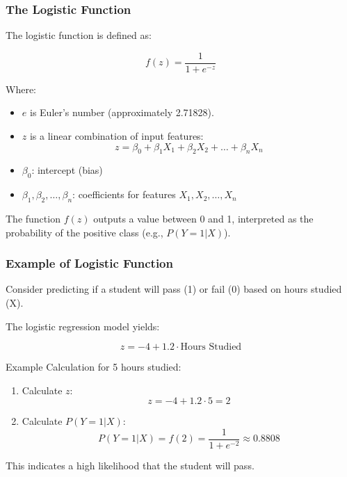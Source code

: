 \documentclass[aspectratio=169]{beamer}
\begin{document}
\begin{frame}[fragile]
    \frametitle{The Logistic Function}
    The logistic function is defined as:
    
    \begin{equation}
        f(z) = \frac{1}{1 + e^{-z}}
    \end{equation}
    
    Where:
    \begin{itemize}
        \item \( e \) is Euler's number (approximately 2.71828).
        \item \( z \) is a linear combination of input features:
        \begin{equation}
            z = \beta_0 + \beta_1 X_1 + \beta_2 X_2 + \dots + \beta_n X_n
        \end{equation}
        \item \( \beta_0 \): intercept (bias)
        \item \( \beta_1, \beta_2, \ldots, \beta_n \): coefficients for features \( X_1, X_2, \ldots, X_n \)
    \end{itemize}
    
    The function \( f(z) \) outputs a value between 0 and 1, interpreted as the probability of the positive class (e.g., \( P(Y=1|X) \)).
\end{frame}

\begin{frame}[fragile]
    \frametitle{Example of Logistic Function}
    Consider predicting if a student will pass (1) or fail (0) based on hours studied (X). 

    The logistic regression model yields:
    
    \begin{equation}
        z = -4 + 1.2 \cdot \text{Hours Studied}
    \end{equation}
    
    Example Calculation for 5 hours studied:
    \begin{enumerate}
        \item Calculate \( z \):
        \[
        z = -4 + 1.2 \cdot 5 = 2
        \]
        
        \item Calculate \( P(Y=1|X) \):
        \[
        P(Y=1|X) = f(2) = \frac{1}{1 + e^{-2}} \approx 0.8808
        \]
    \end{enumerate}
    This indicates a high likelihood that the student will pass.
\end{frame}
\end{document}
